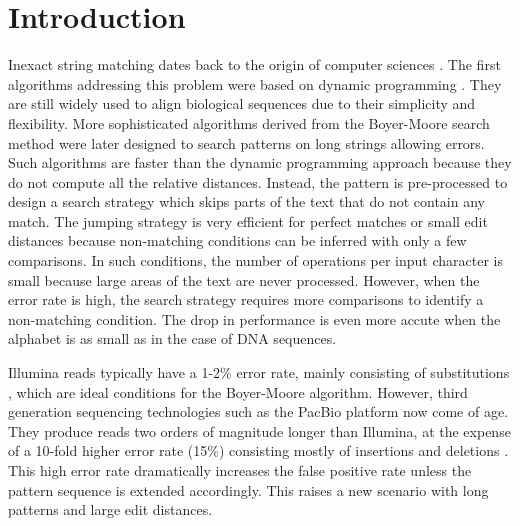 \documentclass{bioinfo}
\begin{document}
\section{Introduction}

Inexact string matching dates back to the origin of computer sciences
\citep{Lev65}. The first algorithms addressing this problem were based
on dynamic programming \citep{NW70}. They are still widely used to
align biological sequences due to their simplicity and flexibility.
More sophisticated algorithms derived from the Boyer-Moore search
method \citep{BM77} were later designed to search patterns on long
strings allowing errors. Such algorithms are faster than the dynamic
programming approach because they do not compute all the relative
distances. Instead, the pattern is pre-processed to design a search
strategy which skips parts of the text that do not contain any
match. The jumping strategy is very efficient for perfect matches or
small edit distances because non-matching conditions can be inferred
with only a few comparisons. In such conditions, the number of
operations per input character is small because large areas of the
text are never processed. However, when the error rate is high, the
search strategy requires more comparisons to identify a non-matching
condition. The drop in performance is even more accute when the alphabet
is as small as in the case of DNA sequences.

Illumina reads typically have a 1-2\% error rate,
mainly consisting of substitutions \citep{Doh08}, which are ideal
conditions for the Boyer-Moore algorithm. However, third generation
sequencing technologies such as the PacBio platform now come of age.
They produce reads two orders of magnitude longer than Illumina, at
the expense of a 10-fold higher error rate (15\%) consisting mostly
of insertions and deletions \citep{Eid09}.  
This high error rate dramatically increases the false
positive rate unless the pattern sequence is extended
accordingly. This raises a new scenario with long patterns and
large edit distances.
\end{document}
